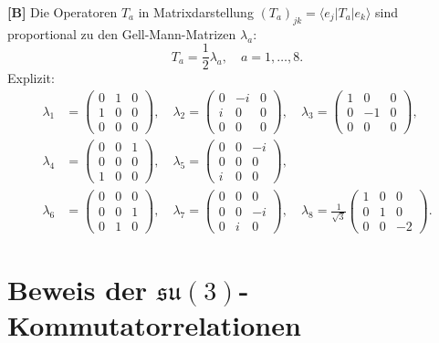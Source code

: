 \textbf{[B]} Die Operatoren $T_a$ in Matrixdarstellung $(T_a)_{jk}
= \langle e_j|T_a|e_k\rangle$ sind proportional zu den
Gell-Mann-Matrizen $\lambda_a$:
\begin{equation}
  T_a = \frac{1}{2}\lambda_a, \quad a = 1,\ldots,8.
  \label{eq:Ta_lambda}
\end{equation}
Explizit:
\begin{align}
  \lambda_1 &=
  \begin{pmatrix}0&1&0\\1&0&0\\0&0&0\end{pmatrix}, \quad
  \lambda_2 =
  \begin{pmatrix}0&-i&0\\i&0&0\\0&0&0\end{pmatrix}, \quad
  \lambda_3 =
  \begin{pmatrix}1&0&0\\0&-1&0\\0&0&0\end{pmatrix}, \nonumber \\
  \lambda_4 &=
  \begin{pmatrix}0&0&1\\0&0&0\\1&0&0\end{pmatrix}, \quad
  \lambda_5 =
  \begin{pmatrix}0&0&-i\\0&0&0\\i&0&0\end{pmatrix}, \nonumber \\
  \lambda_6 &=
  \begin{pmatrix}0&0&0\\0&0&1\\0&1&0\end{pmatrix}, \quad
  \lambda_7 =
  \begin{pmatrix}0&0&0\\0&0&-i\\0&i&0\end{pmatrix}, \quad
  \lambda_8 = \frac{1}{\sqrt{3}}
  \begin{pmatrix}1&0&0\\0&1&0\\0&0&-2\end{pmatrix}.
  \label{eq:gellmann}
\end{align}

\section{Beweis der $\mathfrak{su}(3)$-Kommutatorrelationen}

